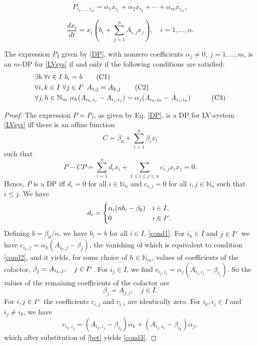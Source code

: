 \documentclass[10pt,a4paper]{amsart}
\def\N{\mathbb{N}}
\begin{document}
\begin{equation} \label{DP}
P_{i_1,\ldots,i_m} = \alpha_1 x_{i_1} + \alpha_2 x_{i_2} + \cdots + \alpha_m x_{i_m},
\end{equation}

\begin{equation} \label{LVsys}
\frac{dx_i}{dt} = x_i\left(b_i + \sum_{j=1}^{n}A_{i,j}x_j\right),\quad i=1,\dots,n.
\end{equation}

\begin{lemma} \label{lem}
The expression $P_I$ given by \eqref{DP}, with nonzero coefficients $\alpha_j\neq 0,\ j=1,\ldots,m$, is an $m$-DP for \eqref{LVsys} if and only if the following conditions are satisfied:
\begin{align}
&\exists b\ \forall i\in I\ b_{i} = b \tag{C1} \label{cond1}\\
&\forall i,k\in I\ \forall j \in I^{\rm c}\ A_{i,j} = A_{k,j} \tag{C2} \label{cond2}\\
&\forall j,h\in \N_m\ \alpha_h (A_{i_h,i_j}-A_{i_j,i_j}) = \alpha_j (A_{i_h,i_h}-A_{i_j,i_h}) \quad \tag{C3} \label{cond3}
\end{align}
\end{lemma}

\begin{proof}
The expression $P = P_I$, as given by Eq. \eqref{DP}, is a DP for LV-system \eqref{LVsys} iff there is an affine function
\[
C=\beta_0+\sum_{i=1}^n\beta_i x_i
\]
such that
\[
\dot{P}-CP=\sum_{i=1}^n d_ix_i +\sum_{1\leq i\leq j\leq n} c_{i,j} x_ix_j=0.
\]
Hence, $P$ is a  DP iff $d_i=0$ for all $i\in \N_n$ and $c_{i,j}=0$ for all $i,j \in \N_n$ such that $i\leq j$. We have
\[
d_i=
\begin{cases}
\alpha_i(nb_i-\beta_0)  & i\in I,\\
0                       & i\in I^{\rm c}.
\end{cases}
\]
Defining $b=\beta_0/n$, we have $b_i=b$ for all $i\in I$, \eqref{cond1}. For $i_k\in I$ and $j\in I^{\rm c}$ we have
$c_{i_k,j}=\alpha_k(A_{i_k,j}-\beta_j)$, the vanishing of which is equivalent to condition \eqref{cond2}, and it yields, for some choice of $h\in\N_m$, values of coefficients of the cofactor, $\beta_j=A_{i_h,j},\quad j\in I^{\rm c}$.
For $i_j\in I$, we find $c_{i_j,i_j}=\alpha_j(A_{i_j,i_j}-\beta_{i_j})$. So the values of the remaining coefficients of the cofactor are
\begin{equation} \label{bet}
\beta_j=A_{j,j},\quad j\in I.
\end{equation}
For $i,j\in I^{\rm c}$ the coefficients $c_{i,j}$ and $c_{i,i}$ are identically zero. For $i_k,i_j\in I$ and $i_j\neq i_k$, we have
\begin{equation} \label{cij}
c_{i_k,i_j}=(A_{i_k,i_j}-\beta_{i_j})\alpha_k+(A_{i_j,i_k}-\beta_{i_k})\alpha_j,
\end{equation}
which after substitution of \eqref{bet} yields \eqref{cond3}.
\end{proof}
\end{document}
